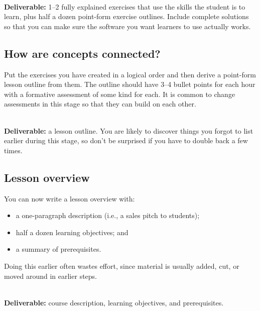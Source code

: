 ~\\
\noindent
\textbf{Deliverable:} 1--2 fully explained exercises
that use the skills the student is to learn,
plus half a dozen point-form exercise outlines.
Include complete solutions
so that you can make sure the software you want learners to use actually works.

\subsection*{How are concepts connected?}

Put the exercises you have created in a logical order
and then derive a point-form lesson outline from them.
The outline should have 3--4 bullet points for each hour
with a formative assessment of some kind for each.
It is common to change assessments in this stage
so that they can build on each other.

~\\
\noindent
\textbf{Deliverable:} a lesson outline.
You are likely to discover things you forgot to list earlier during this stage,
so don't be surprised if you have to double back a few times.

\subsection*{Lesson overview}

You can now write a lesson overview with:

\begin{itemize}

\item
  a one-paragraph description (i.e., a sales pitch to students);

\item
  half a dozen learning objectives; and

\item
  a summary of prerequisites.

\end{itemize}

Doing this earlier often wastes effort,
since material is usually added, cut, or moved around in earlier steps.

~\\
\noindent
\textbf{Deliverable:}
course description,
learning objectives,
and prerequisites.
